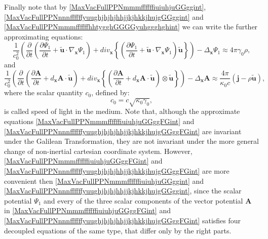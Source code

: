 \documentclass{article}
\theoremstyle{definition}
\theoremstyle{remark}
\renewcommand{\vec}[1]{\mathbf{#1}}
\newcommand{\er}{\eqref}
\newcommand{\er}{\eqref}
\begin{document}
Finally note that by \er{MaxVacFullPPNmmmffffffiuiuhjuGGggint},
\er{MaxVacFullPPNnnnffffffyuughjhjhjhhjjkjhkkjhujgGGggint} and
\er{MaxVacFullPPNmmmffffffhhtygghGGGGyuhggghghint} we can write the
further approximating equations:
\begin{equation}\label{MaxVacFullPPNmmmffffffiuiuhjuGGggFGint}
\frac{1}{c^2_0}\left(\frac{\partial}{\partial
t}\left(\frac{\partial\Psi_1}{\partial t}+\vec {\tilde
u}\cdot\nabla_{\vec x}\Psi_1\right)+div_{\vec x}
\left\{\left(\frac{\partial\Psi_1}{\partial t}+\vec {\tilde
u}\cdot\nabla_{\vec x}\Psi_1\right)\vec {\tilde
u}\right\}\right)-\Delta_{\vec x}\Psi_1 \approx 4\pi\gamma_0\rho,
\end{equation}
and
\begin{equation}\label{MaxVacFullPPNnnnffffffyuughjhjhjhhjjkjhkkjhujgGGggFGint}
\frac{1}{c^2_0}\left(\frac{\partial}{\partial
t}\left(\frac{\partial\vec A}{\partial t}+d_{\vec x}\vec A\cdot\vec
{\tilde u}\right)+div_{\vec x} \left\{\left(\frac{\partial\vec
A}{\partial t}+d_{\vec x}\vec A\cdot\vec {\tilde
u}\right)\otimes\vec {\tilde u}\right\}\right)-\Delta_{\vec x}\vec
A\approx \frac{4\pi}{\kappa_0 c}\left(\vec j-\rho\vec {\tilde
u}\right),
\end{equation}
where the scalar quantity $c_0$, defined by:
\begin{equation}\label{gughhghfbvnbvint}
c_0=c\sqrt{\kappa_0\gamma_0},
\end{equation}
is called speed of light in the medium. Note that, although the
approximate equations \er{MaxVacFullPPNmmmffffffiuiuhjuGGggFGint}
and \er{MaxVacFullPPNnnnffffffyuughjhjhjhhjjkjhkkjhujgGGggFGint} are
invariant under the Galilean Transformation, they are not invariant
under the more general change of non-inertial cartesian coordinate
system. However, \er{MaxVacFullPPNmmmffffffiuiuhjuGGggFGint} and
\er{MaxVacFullPPNnnnffffffyuughjhjhjhhjjkjhkkjhujgGGggFGint} are
more convenient then \er{MaxVacFullPPNmmmffffffiuiuhjuGGggint} and
\er{MaxVacFullPPNnnnffffffyuughjhjhjhhjjkjhkkjhujgGGggint}, since
the scalar potential $\Psi_1$ and every of the three scalar
components of the vector potential $\vec A$ in
\er{MaxVacFullPPNmmmffffffiuiuhjuGGggFGint} and
\er{MaxVacFullPPNnnnffffffyuughjhjhjhhjjkjhkkjhujgGGggFGint}
satisfies four decoupled equations of the same type, that differ
only by the right parts.
\end{document}
